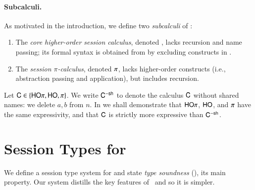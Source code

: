 \documentclass[runningheads]{llncs}
\begin{document}


\paragraph{Subcalculi.}
As motivated in the introduction, 
we define two \emph{subcalculi} of \HOp: 
\begin{enumerate}[$\bullet$]
	\item	The  
		{\em core higher-order session calculus}, denoted \HO,
		 lacks recursion and name passing; its 
		formal syntax is obtained from  by excluding 
		constructs in .

	\item	The   
		 {\em session $\pi$-calculus}, 
		denoted $\pi$, 
		lacks  
		higher-order constructs
		(i.e., abstraction passing and application), but includes recursion.

\end{enumerate}
%
Let $\mathsf{C} \in \{\mathsf{HO}\pi, \mathsf{HO}, \pi\}$. We write 
$\mathsf{C}^{-\mathsf{sh}}$ to denote the calculus $\mathsf{C}$ without shared names:
we delete $a,b$ from $n$. 
In 
we shall demonstrate that 
$\mathsf{HO}\pi$, $\mathsf{HO}$, and $\pi$ have the same expressivity,
and that $\mathsf{C}$ is strictly more expressive than $\mathsf{C}^{-\mathsf{sh}}$.



\section{Session Types for \HOp}
\label{sec:types}

We define a session type system for \HOp and state
\emph{type soundness} (), 
its main property.
Our system distills the key features of~\cite{tlca07,MostrousY15} and so it is simpler.
\end{document}
